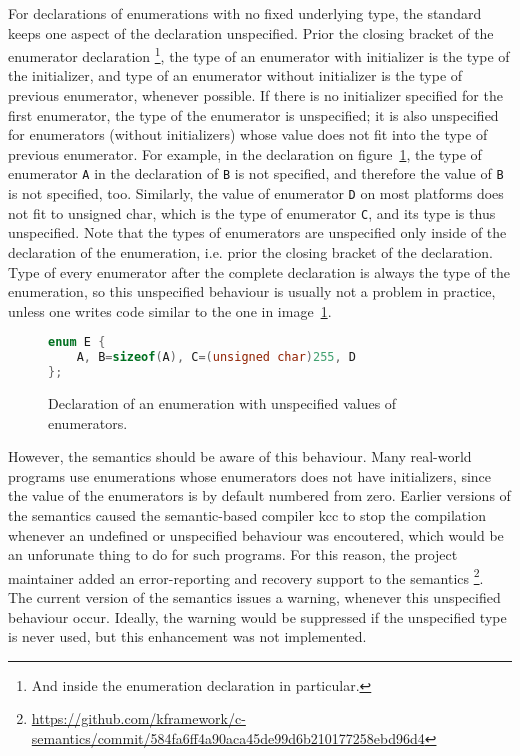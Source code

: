 \documentclass{fithesis3}
\begin{document}
For declarations of enumerations with no fixed underlying type, the standard keeps one aspect of the declaration unspecified. Prior the closing bracket of the enumerator declaration
\footnote{And inside the enumeration declaration in particular.},
the type of an enumerator with initializer is the type of the initializer, and type of an enumerator without initializer is the type of previous enumerator, whenever possible. If there is no initializer specified for the first enumerator, the type of the enumerator is unspecified; it is also unspecified for enumerators (without initializers) whose value does not fit into the type of previous enumerator. 
For example, in the declaration on figure~\ref{fig:ugly-enum}, the type of enumerator \lstinline{A} in the declaration of \lstinline{B} is not specified, and therefore the value of \lstinline{B} is not specified, too. Similarly, the value of enumerator \lstinline{D} on most platforms does not fit to unsigned char, which is the type of enumerator \lstinline{C}, and its type is thus unspecified. Note that the types of enumerators are unspecified only inside of the declaration of the enumeration, i.e. prior the closing bracket of the declaration. Type of every enumerator after the complete declaration is always the type of the enumeration, so this unspecified behaviour is usually not a problem in practice, unless one writes code similar to the one in image~\ref{fig:ugly-enum}.

\begin{figure}[h]
\begin{lstlisting}[language=C++]
enum E {
	A, B=sizeof(A), C=(unsigned char)255, D
};
\end{lstlisting}
\caption{Declaration of an enumeration with unspecified values of enumerators.}
\label{fig:ugly-enum}
\end{figure}

However, the semantics should be aware of this behaviour. Many real-world programs use enumerations whose enumerators does not have initializers, since the value of the enumerators is by default numbered from zero. Earlier versions of the semantics caused the semantic-based compiler kcc to stop the compilation whenever an undefined or unspecified behaviour was encoutered, which would be an unforunate thing to do for such programs. For this reason, the project maintainer added an error-reporting and recovery support to the semantics \footnote{\url{https://github.com/kframework/c-semantics/commit/584fa6ff4a90aca45de99d6b210177258ebd96d4}}. The current version of the semantics issues a warning, whenever this unspecified behaviour occur. Ideally, the warning would be suppressed if the unspecified type is never used, but this enhancement was not implemented.
\end{document}
